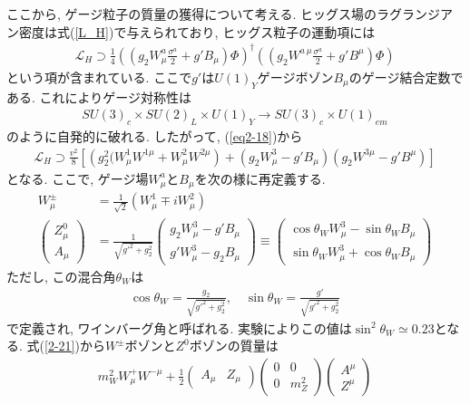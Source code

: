 ここから, ゲージ粒子の質量の獲得について考える.
ヒッグス場のラグランジアン密度は式(\ref{L_H})で与えられており, ヒッグス粒子の運動項には
\begin{align}
  \mathcal{L}_H \supset \frac{1}{4}\left((g_2W^a_\mu\frac{\sigma^a}{2}+g'B_\mu)\Phi\right)^\dagger \left((g_2W^{a\,\mu}\frac{\sigma^a}{2}+g'B^\mu)\Phi\right)\label{eq2-18}
\end{align}
という項が含まれている.
ここで$g'$は$U(1)_Y$ゲージボゾン$B_\mu$のゲージ結合定数である.
これによりゲージ対称性は
\begin{align}
  SU(3)_c\times SU(2)_L\times U(1)_Y \rightarrow SU(3)_c\times U(1)_{em}
\end{align}
のように自発的に破れる.
したがって, (\ref{eq2-18})から
\begin{align}
  \mathcal{L}_H \supset \frac{v^2}{8}\left[\left(g_2^2(W^1_\mu  W^{1\mu}+W^2_\mu  W^{2\mu}\right)+ (g_2W_\mu^3 -g'B_\mu)(g_2W^{3\mu}-g' B^{\mu})\right] \label{2-21}
\end{align}
となる.
ここで, ゲージ場$W_\mu^a$と$B_\mu$を次の様に再定義する.
\begin{align}
  W_\mu^\pm &= \frac{1}{\sqrt{2}}(W_\mu ^1 \mp i W_\mu^2)\\
  \left(\begin{array}{c}
      Z_\mu^0 \\
      A_\mu
      \end{array}\right)&=\frac{1}{\sqrt{g'^2+g_2^2}}\left(\begin{array}{c}
      g_2 W_\mu^3-g' B_\mu \\
      g' W_\mu^3-g_2 B_\mu 
    \end{array}\right)
    \equiv \left(\begin{array}{cc}
        \cos\theta_W W_\mu^3 - \sin\theta_W B_\mu \\
        \sin\theta_W W_\mu^3 + \cos\theta_W B_\mu
      \end{array}
    \right)\label{eq2-22}
\end{align}
ただし, この混合角$\theta_W$は
\begin{align}
  \cos\theta_W = \frac{g_2}{\sqrt{g'^2 + g_2^2}},\quad \sin\theta_W = \frac{g'}{\sqrt{g'^2 + g_2^2}}\nonumber
\end{align}
で定義され, ワインバーグ角と呼ばれる.
実験によりこの値は$\sin^2\theta_W \simeq 0.23$となる.
式(\ref{2-21})から$W^\pm$ボゾンと$Z^0$ボゾンの質量は
\begin{align}
  m_W^2 W_\mu^+W^{-\mu} + \frac{1}{2}\left(\begin{array}{cc}
      A_\mu & Z_\mu
    \end{array}\right) \left(\begin{array}{cc}
      0 & 0 \\
      0 & m_Z^2 
      \end{array}\right)\left(\begin{array}{c}
      A^\mu \\
      Z^\mu
  \end{array}\right)\label{eq2-23}
\end{align}
